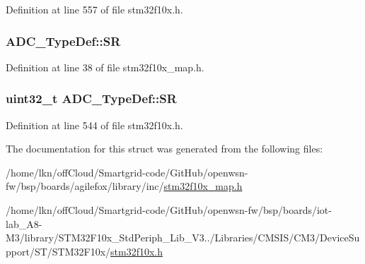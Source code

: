 Definition at line 557 of file stm32f10x.\+h.

\subsubsection[{\texorpdfstring{SR}{SR}}]{ A\+D\+C\+\_\+\+Type\+Def\+::\+SR}\hypertarget{struct_a_d_c___type_def_a69f03eaa828c80ac9b2d34ed13d6b798}{}\label{struct_a_d_c___type_def_a69f03eaa828c80ac9b2d34ed13d6b798}


Definition at line 38 of file stm32f10x\+\_\+map.\+h.

\subsubsection[{\texorpdfstring{SR}{SR}}]{ {\bf uint32\+\_\+t} A\+D\+C\+\_\+\+Type\+Def\+::\+SR}\hypertarget{struct_a_d_c___type_def_a9745df96e98f3cdc2d05ccefce681f64}{}\label{struct_a_d_c___type_def_a9745df96e98f3cdc2d05ccefce681f64}


Definition at line 544 of file stm32f10x.\+h.



The documentation for this struct was generated from the following files\+:\begin{DoxyCompactItemize}
\item 
/home/lkn/off\+Cloud/\+Smartgrid-\/code/\+Git\+Hub/openwsn-\/fw/bsp/boards/agilefox/library/inc/\hyperlink{agilefox_2library_2inc_2stm32f10x__map_8h}{stm32f10x\+\_\+map.\+h}\item 
/home/lkn/off\+Cloud/\+Smartgrid-\/code/\+Git\+Hub/openwsn-\/fw/bsp/boards/iot-\/lab\+\_\+\+A8-\/\+M3/library/\+S\+T\+M32\+F10x\+\_\+\+Std\+Periph\+\_\+\+Lib\+\_\+\+V3../\+Libraries/\+C\+M\+S\+I\+S/\+C\+M3/\+Device\+Support/\+S\+T/\+S\+T\+M32\+F10x/\hyperlink{iot-lab___a8-_m3_2library_2_s_t_m32_f10x___std_periph___lib___v3_85_80_2_libraries_2_c_m_s_i_s_26497265545392eb5694b064ae15018db}{stm32f10x.\+h}\end{DoxyCompactItemize}
